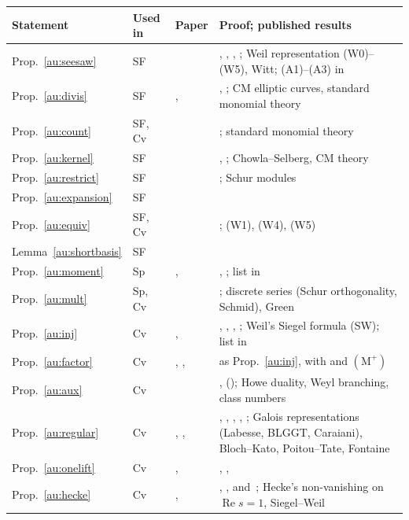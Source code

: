 \documentclass[10pt]{amsart}
\theoremstyle{definition}
\theoremstyle{remark}
\newcommand{\Rel}{\operatorname{Re}}
\begin{document}
\begin{center}
\small
\begin{tabular}{lllp{4.6cm}}
\hline
Statement&Used in&Paper&Proof; published results\\
\hline
Prop.~\ref{au:seesaw}&SF&\cite{P49}&{\cite[\S5.1.7]{P49}}, {\cite[\S5.2]{P49}}, {\cite[Prop.~7.17]{P49}}, {\cite[Prop.~8.4]{P49}}; Weil representation (W0)--(W5), Witt; (A1)--(A3) in {\cite[\S\S3.1 and~3.2]{P49}}\\
Prop.~\ref{au:divis}&SF&\cite{P49}, \cite{P50}&{\cite[\S4.5]{P49}}, {\cite[Cor.~7.16]{P49}}; CM elliptic curves, standard monomial theory\\
\quad Prop.~\ref{au:count}&SF, Cv&\cite{P49}&{\cite[\S4.2]{P49}}; standard monomial theory\\
Prop.~\ref{au:kernel}&SF&\cite{P49}&{\cite[\S5.1.5]{P49}}, {\cite[Thm.~7.9]{P49}}; Chowla--Selberg, CM theory\\
Prop.~\ref{au:restrict}&SF&\cite{P49}&{\cite[\S5.1.4]{P49}}; Schur modules\\
Prop.~\ref{au:expansion}&SF&\cite{P49}&{\cite[\S5.1.6]{P49}}\\
Prop.~\ref{au:equiv}&SF, Cv&\cite{P49}&{\cite[\S5.1.3]{P49}}; (W1), (W4), (W5)\\
Lemma~\ref{au:shortbasis}&SF&\cite{P49}&{\cite[\S5.1.2]{P49}}\\
Prop.~\ref{au:moment}&Sp&\cite{P51}, \cite{P52}&{\cite[\S2]{P51}}, {\cite[Thm.~3.12]{P51}}; list in {\cite[\S2.8]{P51}}\\
Prop.~\ref{au:mult}&Sp, Cv&\cite{P51}&{\cite[\S\S4.1 and~4.2]{P51}}; discrete series (Schur orthogonality, Schmid), Green\\
Prop.~\ref{au:inj}&Cv&\cite{P53}, \cite{P54}&{\cite[\S2.5]{P53}}, {\cite[Prop.~4.46]{P53}}, {\cite[\S\S4.1--4.4]{P53}}, {\cite[Thm.~3.2]{P53}}; Weil's Siegel formula (SW); list in {\cite[\S3.3.9]{P53}}\\
Prop.~\ref{au:factor}&Cv&\cite{P53}, \cite{P54}, \cite{P51}&as Prop.~\ref{au:inj}, with {\cite[Thm.~4.62]{P53}} and $(\mathrm M^+)$\\
Prop.~\ref{au:aux}&Cv&\cite{P53}&{\cite[\S2.7]{P53}}, {\cite[Thm.~2.28]{P53}} ({\cite[\S5.1.6]{P53}}); Howe duality, Weyl branching, class numbers\\
Prop.~\ref{au:regular}&Cv&\cite{P55}, \cite{P56}, \cite{P54}&{\cite[\S2]{P55}}, {\cite[\S\S6.1--8.3]{P55}}, {\cite[\S5]{P55}}, {\cite[Thm.~5.8]{P55}}, {\cite[Props.~3.8 and~3.12]{P54}}; Galois representations (Labesse, BLGGT, Caraiani), Bloch--Kato, Poitou--Tate, Fontaine\\
Prop.~\ref{au:onelift}&Cv&\cite{P54}, \cite{P53}&{\cite[\S2]{P54}}, {\cite[\S6]{P54}}, {\cite[Thm.~3.2]{P53}}\\
Prop.~\ref{au:hecke}&Cv&\cite{P54}, \cite{P53}&{\cite[\S2.7]{P54}}, {\cite[Prop.~3.4]{P54}}, {\cite[Thms.~7.40 and~7.43]{P54}} and~{\cite[Thm.~9.1]{P53}}; Hecke's non-vanishing on $\Rel s=1$, Siegel--Weil\\
\hline
\end{tabular}
\end{center}
\end{document}

